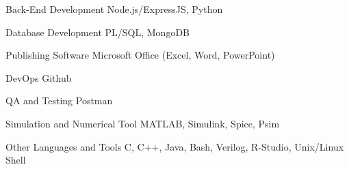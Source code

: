 \newcommand{\Csh}{C{\lserif\#}}



\begin{cvskills}






\cvskill
{Back-End Development} %
{Node.js/ExpressJS, Python} %


\cvskill
{Database Development} %
{PL/SQL, MongoDB} %


\cvskill
{Publishing Software} %
{Microsoft Office (Excel, Word, PowerPoint)} %


\cvskill
{DevOps} %
{Github} %


\cvskill
{QA and Testing} %
{Postman} %


\cvskill
{Simulation and Numerical Tool} %
{MATLAB, Simulink, Spice, Psim} %


\cvskill
{Other Languages and Tools} %
{C, C++, Java, Bash, Verilog, R-Studio, Unix/Linux Shell} %


\end{cvskills}